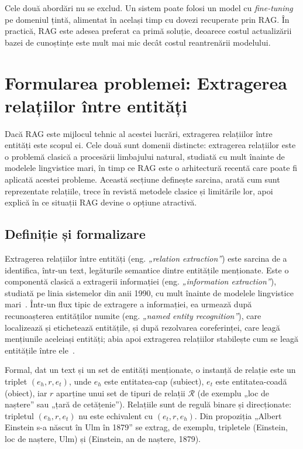 Cele două abordări nu se exclud. Un sistem poate folosi un model cu \textit{fine-tuning} pe domeniul țintă, alimentat în același timp cu dovezi recuperate prin RAG. În practică, RAG este adesea preferat ca primă soluție, deoarece costul actualizării bazei de cunoștințe este mult mai mic decât costul reantrenării modelului.

\section{Formularea problemei: Extragerea relațiilor între entități}

Dacă RAG este mijlocul tehnic al acestei lucrări, extragerea relațiilor între entități este scopul ei. Cele două sunt domenii distincte: extragerea relațiilor este o problemă clasică a procesării limbajului natural, studiată cu mult înainte de modelele lingvistice mari, în timp ce RAG este o arhitectură recentă care poate fi aplicată acestei probleme. Această secțiune definește sarcina, arată cum sunt reprezentate relațiile, trece în revistă metodele clasice și limitările lor, apoi explică în ce situații RAG devine o opțiune atractivă.

\subsection{Definiție și formalizare}

Extragerea relațiilor între entități (eng. \textit{„relation extraction”}) este sarcina de a identifica, într-un text, legăturile semantice dintre entitățile menționate. Este o componentă clasică a extragerii informației (eng. \textit{„information extraction”}), studiată pe linia sistemelor din anii 1990, cu mult înainte de modelele lingvistice mari~\cite{hearst1992}. Într-un flux tipic de extragere a informației, ea urmează după recunoașterea entităților numite (eng. \textit{„named entity recognition”}), care localizează și etichetează entitățile, și după rezolvarea coreferinței, care leagă mențiunile aceleiași entități; abia apoi extragerea relațiilor stabilește cum se leagă entitățile între ele~\cite{yao2019docred}.

Formal, dat un text și un set de entități menționate, o instanță de relație este un triplet $(e_h, r, e_t)$, unde $e_h$ este entitatea-cap (subiect), $e_t$ este entitatea-coadă (obiect), iar $r$ aparține unui set de tipuri de relații $\mathcal{R}$ (de exemplu „loc de naștere” sau „țară de cetățenie”). Relațiile sunt de regulă binare și direcționate: tripletul $(e_h, r, e_t)$ nu este echivalent cu $(e_t, r, e_h)$. Din propoziția „Albert Einstein s-a născut în Ulm în 1879” se extrag, de exemplu, tripletele (\mbox{Einstein}, loc de naștere, Ulm) și (\mbox{Einstein}, an de naștere, 1879).

